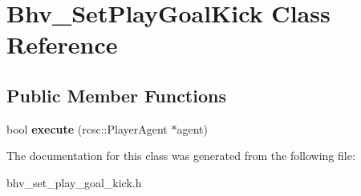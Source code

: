\hypertarget{classBhv__SetPlayGoalKick}{
\section{Bhv\_\-SetPlayGoalKick Class Reference}
\label{classBhv__SetPlayGoalKick}
}
\subsection*{Public Member Functions}
\begin{DoxyCompactItemize}
\item 
\hypertarget{classBhv__SetPlayGoalKick_a959329d27143b7014f69b71320c312d4}{
bool {\bfseries execute} (rcsc::PlayerAgent $\ast$agent)}
\label{classBhv__SetPlayGoalKick_a959329d27143b7014f69b71320c312d4}

\end{DoxyCompactItemize}


The documentation for this class was generated from the following file:\begin{DoxyCompactItemize}
\item 
bhv\_\-set\_\-play\_\-goal\_\-kick.h\end{DoxyCompactItemize}
